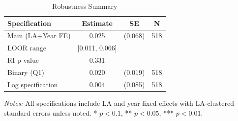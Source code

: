 \begin{table}[htbp]
\centering
\caption{Robustness Summary}
\label{tab:robustness}
\begin{tabular}{lccc}
\toprule
Specification & Estimate & SE & N \\
\midrule
Main (LA+Year FE) & 0.025 & (0.068) & 518 \\
LOOR range & [0.011, 0.066] &  &  \\
RI p-value & 0.331 &  &  \\
Binary (Q1) & 0.020 & (0.019) & 518 \\
Log specification & 0.004 & (0.085) & 518 \\
\bottomrule
\end{tabular}
\begin{tablenotes}[flushleft]
\small
\item \textit{Notes:} All specifications include LA and year fixed effects with LA-clustered standard errors unless noted. * $p<0.1$, ** $p<0.05$, *** $p<0.01$.
\end{tablenotes}
\end{table}
